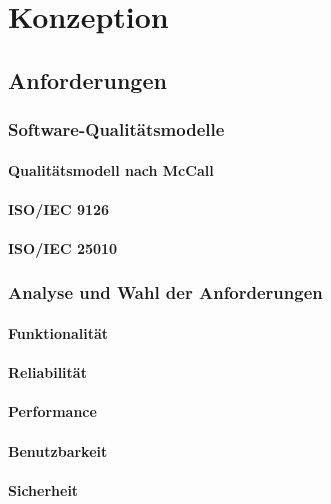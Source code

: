 \section{Konzeption}

\subsection{Anforderungen}

\subsubsection{Software-Qualitätsmodelle}

\paragraph{Qualitätsmodell nach McCall}

\paragraph{ISO/IEC 9126}

\paragraph{ISO/IEC 25010}
 
\subsubsection{Analyse und Wahl der Anforderungen}

\paragraph{Funktionalität}

\paragraph{Reliabilität}

\paragraph{Performance}

\paragraph{Benutzbarkeit}

\paragraph{Sicherheit}

